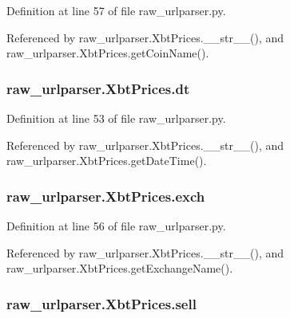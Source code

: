Definition at line 57 of file raw\-\_\-urlparser.\-py.



Referenced by raw\-\_\-urlparser.\-Xbt\-Prices.\-\_\-\-\_\-str\-\_\-\-\_\-(), and raw\-\_\-urlparser.\-Xbt\-Prices.\-get\-Coin\-Name().

\hypertarget{classraw__urlparser_1_1_xbt_prices_ae094aa3e73d21d0be219a085f09bcf13}{
\subsubsection[{dt}]{\setlength{\rightskip}{0pt plus 5cm}raw\-\_\-urlparser.\-Xbt\-Prices.\-dt}}\label{classraw__urlparser_1_1_xbt_prices_ae094aa3e73d21d0be219a085f09bcf13}


Definition at line 53 of file raw\-\_\-urlparser.\-py.



Referenced by raw\-\_\-urlparser.\-Xbt\-Prices.\-\_\-\-\_\-str\-\_\-\-\_\-(), and raw\-\_\-urlparser.\-Xbt\-Prices.\-get\-Date\-Time().

\hypertarget{classraw__urlparser_1_1_xbt_prices_a016bbd95465aaa14b5c434047df7b7fb}{
\subsubsection[{exch}]{\setlength{\rightskip}{0pt plus 5cm}raw\-\_\-urlparser.\-Xbt\-Prices.\-exch}}\label{classraw__urlparser_1_1_xbt_prices_a016bbd95465aaa14b5c434047df7b7fb}


Definition at line 56 of file raw\-\_\-urlparser.\-py.



Referenced by raw\-\_\-urlparser.\-Xbt\-Prices.\-\_\-\-\_\-str\-\_\-\-\_\-(), and raw\-\_\-urlparser.\-Xbt\-Prices.\-get\-Exchange\-Name().

\hypertarget{classraw__urlparser_1_1_xbt_prices_a22b483cac27a5b17f9e7b265c219bb99}{
\subsubsection[{sell}]{\setlength{\rightskip}{0pt plus 5cm}raw\-\_\-urlparser.\-Xbt\-Prices.\-sell}}\label{classraw__urlparser_1_1_xbt_prices_a22b483cac27a5b17f9e7b265c219bb99}


